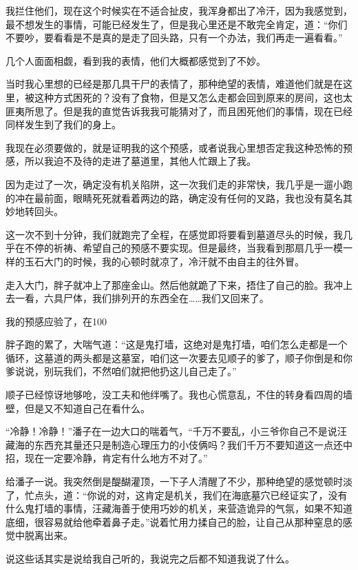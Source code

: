 我拦住他们，现在这个时候实在不适合扯皮，我浑身都出了冷汗，因为我感觉到，最不想发生的事情，可能已经发生了，但是我心里还是不敢完全肯定，道：“你们不要吵，要看看是不是真的是走了回头路，只有一个办法，我们再走一遍看看。”

几个人面面相觑，看到我的表情，他们大概都感觉到了不妙。

当时我心里想的已经是那几具干尸的表情了，那种绝望的表情，难道他们就是在这里，被这种方式困死的？没有了食物，但是又怎么走都会回到原来的房间，这也太匪夷所思了。但是我的直觉告诉我我可能猜对了，而且困死他们的事情，现在已经同样发生到了我们的身上。

我现在必须要做的，就是证明我的这个预感，或者说我心里想否定我这种恐怖的预感，所以我迫不及待的走进了墓道里，其他人忙跟上了我。

因为走过了一次，确定没有机关陷阱，这一次我们走的非常快，我几乎是一遛小跑的冲在最前面，眼睛死死就看着两边的路，确定没有任何的叉路，我也没有莫名其妙地转回头。

这一次不到十分钟，我们就跑完了全程，在感觉即将要看到墓道尽头的时候，我几乎在不停的祈祷、希望自己的预感不要实现。但是最终，当我看到那扇几乎一模一样的玉石大门的时候，我的心顿时就凉了，冷汗就不由自主的往外冒。

走入大门，胖子就冲上了那座金山。然后他就跪了下来，捂住了自己的脸。我冲上去一看，六具尸体，我们排列开的东西全在……我们又回来了。

我的预感应验了，在100%

胖子跑的累了，大喘气道：“这是鬼打墙，这绝对是鬼打墙，咱们怎么走都是一个循环，这墓道的两头都是这墓室，咱们这一次要去见顺子的爹了，顺子你倒是和你爹说说，别玩我们，不然咱们就把他扔这儿自己走了。”

顺子已经惊讶地够呛，没工夫和他绊嘴了。我也心慌意乱，不住的转身看四周的墙壁，但是又不知道自己在看什么。

“冷静！冷静！”潘子在一边大口的喘着气，“千万不要乱，小三爷你自己不是说汪藏海的东西充其量还只是制造心理压力的小伎俩吗？我们千万不要知道这一点还中招，现在一定要冷静，肯定有什么地方不对了。”

给潘子一说。我突然倒是醍醐灌顶，一下子人清醒了不少，那种绝望的感觉顿时淡了，忙点头，道：“你说的对，这肯定是机关，我们在海底墓穴已经证实了，没有什么鬼打墙的事情，汪藏海善于使用巧妙的机关，来营造诡异的气氛，如果不知道底细，很容易就给他牵着鼻子走。”说着忙用力揉自己的脸，让自己从那种窒息的感觉中脱离出来。

说这些话其实是说给我自己听的，我说完之后都不知道我说了什么。

